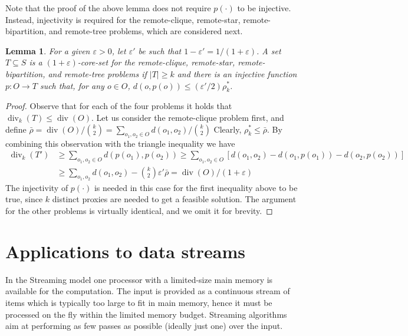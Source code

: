 \documentclass{article}
\newtheorem{lemma}{Lemma}
\DeclareMathOperator{\diversity}{div}
\renewcommand{\epsilon}{\varepsilon}
\begin{document}
Note that the proof of the above lemma does not require $p(\cdot)$ to
be injective. Instead, injectivity is required for the remote-clique,
remote-star, remote-bipartition, and remote-tree problems, which are 
considered next.
\begin{lemma}\label{lem:remote-csbt}
For a given $\epsilon > 0$, let $\epsilon'$ be such that
$1-\epsilon'=1/(1+\epsilon)$. A set $T\subseteq S$ is a
$(1+\epsilon)$-core-set for the remote-clique, remote-star,
remote-bipartition, and remote-tree problems if
$|T| \ge k$ and  there is an injective function $p: O \rightarrow T$ such that,
for any $o\in O$, $d(o, p(o))\le (\epsilon'/2) \rho_k^*$.
\end{lemma}
\begin{proof}
  Observe that for each of the four problems it holds that
  $\diversity_k(T) \leq \diversity(O)$. Let us consider the
  remote-clique problem first, and define
  $\bar{\rho} = \diversity(O)/{k\choose 2} =
  \sum_{o_1, o_2 \in O}d(o_1, o_2)/{k\choose 2}$
  Clearly, $\rho_k^*\le \bar{\rho}$. By combining this observation with the
  triangle inequality we have
  \[
    \begin{aligned}
      \diversity_k(T') 
      &\ge \sum_{o_1, o_2\in O} d(p(o_1), p(o_2))
      \ge \sum_{o_1, o_2\in O} \left[ 
        d(o_1, o_2) - d(o_1, p(o_1)) - d(o_2, p(o_2))
      \right] \\
      &\ge \sum_{o_1, o_2} d(o_1, o_2) - {k\choose
        2}\epsilon'\bar{\rho} = \diversity(O)/(1+\epsilon) 
    \end{aligned}
  \]
  The injectivity of $p(\cdot)$ is needed in this case for the first
  inequality above to be true, since $k$ distinct proxies are needed to get a
  feasible solution. The argument for the other problems is virtually
  identical, and we omit it for brevity.
\end{proof}


\section{Applications to data streams}
\label{sec:streaming}

In the Streaming model \cite{RaghavanH99} one processor with a
limited-size main memory is available for the computation. The input
is provided as a continuous stream of items which is typically too
large to fit in main memory, hence it must be processed on the fly
within the limited memory budget.  Streaming algorithms aim at
performing as few passes as possible (ideally just one) over the
input.
\end{document}
